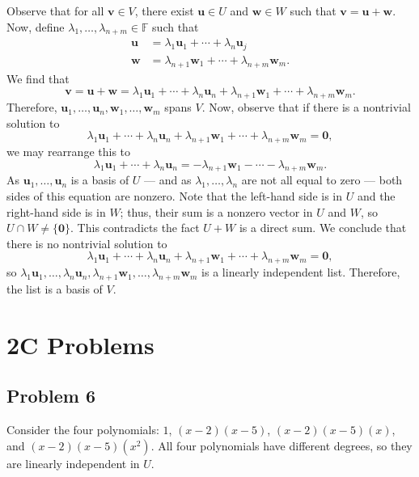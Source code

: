 \documentclass[11pt]{article}
\renewcommand{\vec}[1]{\mathbf{#1}}
\begin{document}
Observe that for all $\vec{v} \in V$, there exist $\vec{u} \in U$ and $\vec{w} \in W$ such that $\vec{v} = \vec{u} + \vec{w}$. Now, define $\lambda_{1}, \ldots, \lambda_{n + m} \in \mathbb{F}$ such that
\begin{align*}
	\vec{u} &= \lambda_{1} \vec{u}_{1} + \cdots + \lambda_{n} \vec{u}_{j} \\
	\vec{w} &= \lambda_{n + 1} \vec{w}_{1} + \cdots + \lambda_{n + m} \vec{w}_{m}.
\end{align*}
We find that
\[
	\vec{v} = \vec{u} + \vec{w} = \lambda_{1} \vec{u}_{1} + \cdots + \lambda_{n} \vec{u}_{n} + \lambda_{n + 1} \vec{w}_{1} + \cdots + \lambda_{n + m} \vec{w}_{m}.
\]
Therefore, $\vec{u}_{1}, \ldots, \vec{u}_{n}, \vec{w}_{1}, \ldots, \vec{w}_{m}$ spans $V$. Now, observe that if there is a nontrivial solution to
\[
	\lambda_{1} \vec{u}_{1} + \cdots + \lambda_{n} \vec{u}_{n} + \lambda_{n + 1} \vec{w}_{1} + \cdots + \lambda_{n + m} \vec{w}_{m} = \vec{0},
\]
we may rearrange this to 
\[
	\lambda_{1} \vec{u}_{1} + \cdots + \lambda_{n} \vec{u}_{n} = - \lambda_{n + 1} \vec{w}_{1}	- \cdots - \lambda_{n + m} \vec{w}_{m}.
\]
As $\vec{u}_{1}, \ldots, \vec{u}_{n}$ is a basis of $U$ --- and as $\lambda_{1}, \ldots, \lambda_{n}$ are not all equal to zero --- both sides of this equation are nonzero. Note that the left-hand side is in $U$ and the right-hand side is in $W$; thus, their sum is a nonzero vector in $U$ and $W$, so $U \cap W \ne \{ \vec{0} \}$. This contradicts the fact $U + W$ is a direct sum. We conclude that there is no nontrivial solution to 
\[
	\lambda_{1} \vec{u}_{1} + \cdots + \lambda_{n} \vec{u}_{n} + \lambda_{n + 1} \vec{w}_{1} + \cdots + \lambda_{n + m} \vec{w}_{m} = \vec{0},
\]
so $\lambda_{1} \vec{u}_{1}, \ldots, \lambda_{n} \vec{u}_{n}, \lambda_{n+1} \vec{w}_{1}, \ldots, \lambda_{n + m} \vec{w}_{m}$ is a linearly independent list. Therefore, the list is a basis of $V$.


\section{2C Problems}


\subsection{Problem 6}


Consider the four polynomials: $1$, $(x-2)(x-5)$, $(x-2)(x-5)(x)$, and $(x-2)(x-5)(x^{2})$. All four polynomials have different degrees, so they are linearly independent in $U$. 
\end{document}
